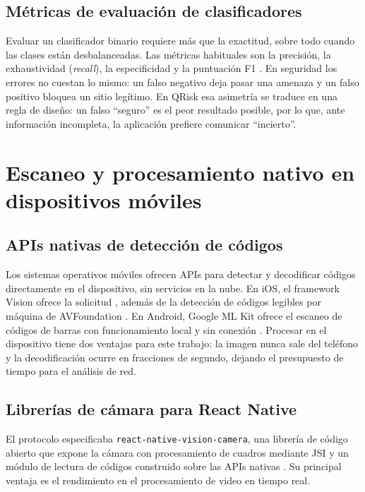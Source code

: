 \subsection{Métricas de evaluación de clasificadores}

Evaluar un clasificador binario requiere más que la exactitud, sobre todo cuando las clases están desbalanceadas. Las métricas habituales son la precisión, la exhaustividad (\emph{recall}), la especificidad y la puntuación F1 \cite{sokolova2009systematic}. En seguridad los errores no cuestan lo mismo: un falso negativo deja pasar una amenaza y un falso positivo bloquea un sitio legítimo. En QRisk esa asimetría se traduce en una regla de diseño: un falso ``seguro'' es el peor resultado posible, por lo que, ante información incompleta, la aplicación prefiere comunicar ``incierto''.

\section{Escaneo y procesamiento nativo en dispositivos móviles}

\subsection{APIs nativas de detección de códigos}

Los sistemas operativos móviles ofrecen APIs para detectar y decodificar códigos directamente en el dispositivo, sin servicios en la nube. En iOS, el framework Vision ofrece la solicitud  \cite{apple_vndetectbarcodes}, además de la detección de códigos legibles por máquina de AVFoundation \cite{apple_tn2325}. En Android, Google ML Kit ofrece el escaneo de códigos de barras con funcionamiento local y sin conexión \cite{google_mlkit_barcode}. Procesar en el dispositivo tiene dos ventajas para este trabajo: la imagen nunca sale del teléfono y la decodificación ocurre en fracciones de segundo, dejando el presupuesto de tiempo para el análisis de red.

\subsection{Librerías de cámara para React Native}

El protocolo especificaba \texttt{react-native-vision-camera}, una librería de código abierto que expone la cámara con procesamiento de cuadros mediante JSI y un módulo de lectura de códigos construido sobre las APIs nativas \cite{rousavy_visioncamera}. Su principal ventaja es el rendimiento en el procesamiento de video en tiempo real.

